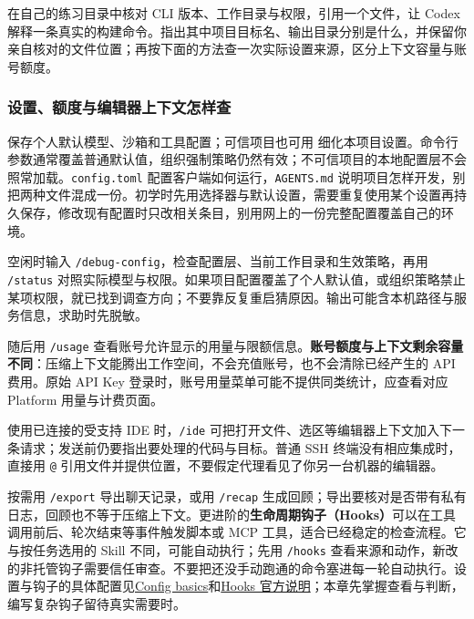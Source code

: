 \begin{exercise}\label{ex:ai-cli-start}
在自己的练习目录中核对 CLI 版本、工作目录与权限，引用一个文件，让 Codex 解释一条真实的构建命令。指出其中项目目标名、输出目录分别是什么，并保留你亲自核对的文件位置；再按下面的方法查一次实际设置来源，区分上下文容量与账号额度。
\end{exercise}

\subsubsection{设置、额度与编辑器上下文怎样查}

 保存个人默认模型、沙箱和工具配置；可信项目也可用  细化本项目设置。命令行参数通常覆盖普通默认值，组织强制策略仍然有效；不可信项目的本地配置层不会照常加载。\texttt{config.toml} 配置客户端如何运行，\texttt{AGENTS.md} 说明项目怎样开发，别把两种文件混成一份。初学时先用选择器与默认设置，需要重复使用某个设置再持久保存，修改现有配置时只改相关条目，别用网上的一份完整配置覆盖自己的环境。

\begin{example}
空闲时输入 \texttt{/debug-config}，检查配置层、当前工作目录和生效策略，再用 \texttt{/status} 对照实际模型与权限。如果项目配置覆盖了个人默认值，或组织策略禁止某项权限，就已找到调查方向；不要靠反复重启猜原因。输出可能含本机路径与服务信息，求助时先脱敏。

随后用 \texttt{/usage} 查看账号允许显示的用量与限额信息。\textbf{账号额度与上下文剩余容量不同}：压缩上下文能腾出工作空间，不会充值账号，也不会清除已经产生的 API 费用。原始 API Key 登录时，账号用量菜单可能不提供同类统计，应查看对应 Platform 用量与计费页面。

使用已连接的受支持 IDE 时，\texttt{/ide} 可把打开文件、选区等编辑器上下文加入下一条请求；发送前仍要指出要处理的代码与目标。普通 SSH 终端没有相应集成时，直接用 \texttt{@} 引用文件并提供位置，不要假定代理看见了你另一台机器的编辑器。
\end{example}

按需用 \texttt{/export} 导出聊天记录，或用 \texttt{/recap} 生成回顾；导出要核对是否带有私有日志，回顾也不等于压缩上下文。更进阶的\textbf{生命周期钩子（Hooks）}可以在工具调用前后、轮次结束等事件触发脚本或 MCP 工具，适合已经稳定的检查流程。它与按任务选用的 Skill 不同，可能自动执行；先用 \texttt{/hooks} 查看来源和动作，新改的非托管钩子需要信任审查。不要把还没手动跑通的命令塞进每一轮自动执行。设置与钩子的具体配置见\href{https://learn.chatgpt.com/docs/config-file/config-basic}{Config basics}和\href{https://learn.chatgpt.com/docs/hooks}{Hooks 官方说明}；本章先掌握查看与判断，编写复杂钩子留待真实需要时。

